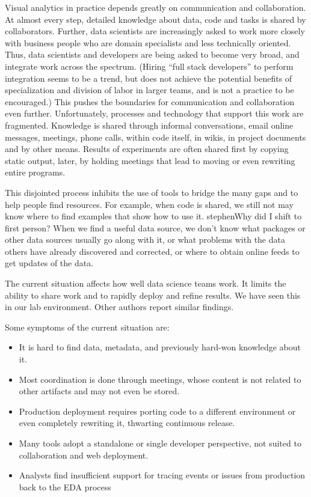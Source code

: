 Visual analytics in practice depends greatly on communication and collaboration.
At almost every step, detailed knowledge about data, code and tasks
is shared by collaborators. 
Further, data scientists are increasingly asked to work more closely
with business people who are domain specialists and less technically oriented.
Thus, data scientists and developers are being asked to become
very broad, and integrate work across the spectrum. (Hiring ``full stack
developers'' to perform integration seems to be a trend, but does not achieve
the potential benefits of specialization and division of labor in larger
teams, and is not a practice to be encouraged.)
This pushes the boundaries for communication and collaboration even further.
Unfortunately, processes and technology that support this work are fragmented.
Knowledge is shared through informal conversations, email online messages,
meetings, phone calls, within code itself, in wikis, in project documents and
by other means. Results of experiments are often shared first by copying static
output, later, by holding meetings that lead to moving or even rewriting
entire programs.

This disjointed process inhibits the use of tools to bridge
the many gaps and to help people find resources.
For example, when code is shared, we still not may know where to find examples
that show how to use it. stephen{Why did I shift to first person?}
When we find a useful data source, we don't know what packages or
other data sources usually go along with it, or what problems with the data
others have already discovered and corrected, or where to obtain online feeds
to get updates of the data.

The current situation affects how well data science teams work. It limits
the ability to share work and to rapidly deploy and refine results.
We have seen this in our lab environment.
Other authors report similar findings.

Some symptoms of the current situation are:
\begin{itemize}
\item It is hard to find data, metadata, and previously hard-won knowledge about it.
\item Most coordination is done through meetings, whose content is not related to other artifacts and may not even be stored.
\item Production deployment requires porting code to a different environment or even completely rewriting it, thwarting continuous release.
\item Many tools adopt a standalone or single developer perspective,
not suited to collaboration and web deployment. 
\item Analysts find insufficient support for tracing events or issues from production back to the EDA process
\end{itemize}

